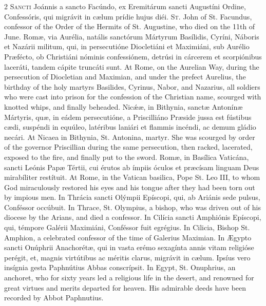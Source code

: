 \begin{paracol}{2}
\lettrine[lines=2]{S}{ancti} Joánnis a sancto Facúndo, ex Eremitárum sancti 
 Augustíni Ordine, Confessóris, qui migrávit in cælum prídie hujus diéi.
\switchcolumn
{}
\lettrine[lines=2]{S}{t.} John of St. Facundus, confessor of the Order of the 
 Hermits of St. Augustine, who died on the 11th of June.
\switchcolumn*
{}
Romæ, via Aurélia, natális sanctórum Mártyrum Basílidis, 
 Cyríni, Náboris et Nazárii militum, qui, in persecutióne Diocletiáni et 
 Maximiáni, sub Aurélio Præfécto, ob Christiáni nóminis confessiónem, detrúsi 
 in cárcerem et scorpiónibus laceráti, tandem cápite truncáti sunt.
\switchcolumn
{}
At Rome, on the Aurelian Way, during the persecution of 
 Diocletian and Maximian, and under the prefect Aurelius, the birthday of the 
 holy martyrs Basilides, Cyrinus, Nabor, and Nazarius, all soldiers who were 
 cast into prison for the confession of the Christian name, scourged with 
 knotted whips, and finally beheaded.
\switchcolumn*
{}
Nicǽæ, in Bithynia, sanctæ Antonínæ Mártyris, quæ, in 
 eádem persecutióne, a Priscilliáno Præside jussa est fústibus cædi, suspéndi 
 in equúleo, latéribus laniári et flammis incéndi, ac demum gládio necári.
\switchcolumn
{}
At Nicaea in Bithynia, St. Antonina, martyr. She 
 was scourged by order of the governor Priscillian during the same 
 persecution, then racked, lacerated, exposed to the fire, and finally put to 
 the sword.
\switchcolumn*
{}
Romæ, in Basílica Vaticána, sancti Leónis Papæ Tértii, 
 cui érutos ab ímpiis óculos et præcísam linguam Deus mirabíliter restítuit.
\switchcolumn
{}
At Rome, in the Vatican basilica, Pope St. Leo III, to 
 whom God miraculously restored his eyes and his tongue after they had been 
 torn out by impious men.
\switchcolumn*
{}
In Thrácia sancti Ol\'ympii Epíscopi, qui, ab Ariánis sede 
 pulsus, Conféssor occúbuit.
\switchcolumn
{}
In Thrace, St. Olympius, a bishop, who was driven out of 
 his diocese by the Arians, and died a confessor.
\switchcolumn*
{}
In Cilícia sancti Amphiónis Epíscopi, qui, témpore 
 Galérii Maximiáni, Conféssor fuit egrégius.
\switchcolumn
{}
In Cilicia, Bishop St. Amphion, a celebrated confessor of 
 the time of Galerius Maximian.
\switchcolumn*
{}
In Ægypto sancti Onúphrii Anachorétæ, qui in vasta erémo 
 sexagínta annis vitam religióse perégit, et, magnis virtútibus ac méritis 
 clarus, migrávit in cælum. Ipsíus vero insígnia gesta Paphnútius Abbas 
 conscrípsit.
\switchcolumn
{}
In Egypt, St. Onuphrius, an anchoret, who for sixty years 
 led a religious life in the desert, and renowned for great virtues and 
 merits departed for heaven. His admirable deeds have been recorded by 
 Abbot Paphnutius.
\switchcolumn*
{}
\end{paracol}


